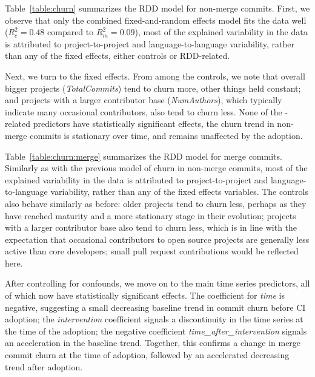 Table~\ref{table:churn} summarizes the RDD model for non-merge commits.
First, we observe that only the combined fixed-and-random effects model fits the 
data well ($R_c^2 = 0.48$ compared to $R_m^2 = 0.09$), \ie most of the explained 
variability in the data is attributed to project-to-project and language-to-language
variability, rather than any of the fixed effects, either controls or RDD-related.

Next, we turn to the fixed effects.
From among the controls, we note that overall bigger projects (\emph{TotalCommits}) 
tend to churn more, other things held constant; and projects with a larger contributor 
base (\emph{NumAuthors}), which typically indicate many occasional contributors, 
also tend to churn less.
None of the \Tvi-related predictors have statistically significant effects,
\ie the churn trend in non-merge commits is stationary over time, and 
remains unaffected by the \Tvis adoption.

Table~\ref{table:churn:merge} summarizes the RDD model for merge commits.
Similarly as with the previous model of churn in non-merge commits, most of 
the explained variability in the data is attributed to project-to-project and 
language-to-language variability, rather than any of the fixed effects variables.
The controls also behave similarly as before: older projects tend to churn less, 
perhaps as they have reached maturity and a more stationary stage in their 
evolution; projects with a larger contributor base also tend to churn less, which 
is in line with the expectation that occasional contributors to open source projects 
are generally less active than core developers; small pull request contributions
would be reflected here.

After controlling for confounds, we move on to the main time series predictors,
all of which now have statistically significant effects.
The coefficient for \emph{time} is negative, suggesting a small decreasing
baseline trend in commit churn before CI adoption; the \emph{intervention}
coefficient signals a discontinuity in the time series at the time of the \Tvis
adoption; the negative coefficient \emph{time\_after\_intervention} signals
an acceleration in the baseline trend.
Together, this confirms a change in merge commit churn at the time 
of adoption, followed by an accelerated decreasing trend after adoption.

